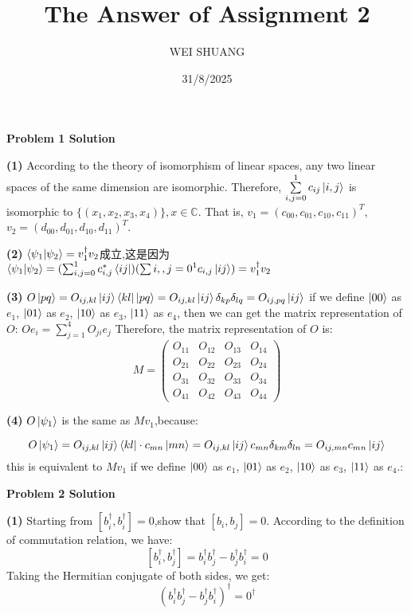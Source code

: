 \documentclass[12pt]{article}
\title{The Answer of Assignment 2}
\author{WEI SHUANG}
\date{31/8/2025}
\begin{document}
\maketitle

\begin{center}
    \textbf{Problem 1 Solution}
\end{center}

\textbf{(1)}
According to the theory of isomorphism of linear spaces, any two linear spaces of the same dimension are isomorphic. Therefore, $\sum\limits_{i,j=0}^{1}c_{ij}\ket{i,j}$ is isomorphic to $\{(x_1,x_2,x_3,x_4)\}, x\in \mathbb{C}$. That is, $v_1=(c_{00},c_{01},c_{10},c_{11})^T$, $v_2=(d_{00},d_{01},d_{10},d_{11})^T$.




\textbf{(2)}
$\braket{\psi_1|\psi_2}=v_1^\dagger v_2$成立,这是因为
$\braket{\psi_1|\psi_2}=(\sum_{i,j=0}^1c_{i,j}^*\bra{ij})(\sum{i,,j=0}^1c_{i,j}\ket{ij})=v_1^\dagger v_2$

\textbf{(3)}
$O\ket{pq}=O_{ij,kl}\ket{ij}\bra{kl}\ket{pq}=O_{ij,kl}\ket{ij}\delta_{kp}\delta_{lq}=O_{ij,pq}\ket{ij}$ 
if we define $\ket{00}$ as $e_1$, $\ket{01}$ as $e_2$, $\ket{10}$ as $e_3$, $\ket{11}$ as $e_4$, then we can get the matrix representation of $O$:
$Oe_i=\sum_{j=1}^4O_{ji}e_j$
Therefore, the matrix representation of $O$ is:
\[M=\begin{pmatrix}
O_{11} & O_{12} & O_{13} & O_{14} \\
O_{21} & O_{22} & O_{23} & O_{24} \\
O_{31} & O_{32} & O_{33} & O_{34} \\
O_{41} & O_{42} & O_{43} & O_{44}    
\end{pmatrix}\]

\textbf{(4)}
$O\ket{\psi_1}$ is the same as $Mv_1$,because:

\[
O\ket{\psi_1}=O_{ij,kl}\ket{ij}\bra{kl}\cdot c_{mn}\ket{mn}=O_{ij,kl}\ket{ij}c_{mn}\delta_{km}\delta_{ln}=O_{ij,mn}c_{mn}\ket{ij}
\]
this is equivalent to $Mv_1$ if we define $\ket{00}$ as $e_1$, $\ket{01}$ as $e_2$, $\ket{10}$ as $e_3$, $\ket{11}$ as $e_4$.:

\begin{center}
    \textbf{Problem 2 Solution}
\end{center}

\textbf{(1)}
Starting from $[b_i^\dagger,b_i^\dagger]=0$,show that $[b_i,b_j]=0$.
According to the definition of commutation relation, we have:
\[[b_i^\dagger,b_j^\dagger]=b_i^\dagger b_j^\dagger - b_j^\dagger b_i^\dagger=0\]
Taking the Hermitian conjugate of both sides, we get:
\[(b_i^\dagger b_j^\dagger - b_j^\dagger b_i^\dagger)^\dagger = 0^\dagger\]
\end{document}
